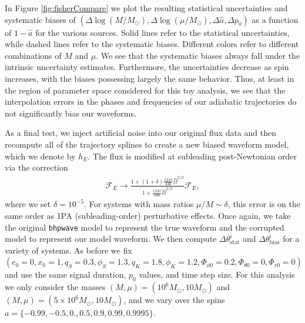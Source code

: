 \documentclass[%
 reprint,
 nofootinbib,
 amsmath,amssymb,
 aps,
 prd,
]{revtex4-2}
\begin{document}
In Figure \ref{fig:fisherCompare} we plot the resulting statistical uncertainties and systematic biases of $(\Delta\log(M/M_\odot), \Delta\log(\mu/M_\odot), \Delta \hat{a}, \Delta p_0)$ as a function of $1-\hat{a}$ for the various sources. Solid lines refer to the statistical uncertainties, while dashed lines refer to the systematic biases. Different colors refer to different combinations of $M$ and $\mu$. We see that the systematic biases always fall under the intrinsic uncertainty estimates. Furthermore, the uncertainties decrease as spin increases, with the biases possessing largely the same behavior. Thus, at least in the region of parameter space considered for this toy analysis, we see that the interpolation errors in the phases and frequencies of our adiabatic trajectories do not significantly bias our waveforms.

As a final test, we inject artificial noise into our original flux data and then recompute all of the trajectory splines to create a new biased waveform model, which we denote by $h_E$. The flux is modified at subleading post-Newtonian order via the correction
\begin{align}
    \mathcal{F}_E \rightarrow \frac{1 + (1 + \delta)\frac{1247}{336}\hat{\Omega}^{2/3}}{1 + \frac{1247}{336}\hat{\Omega}^{2/3}} \mathcal{F}_E,
\end{align}
where we set $\delta = 10^{-5}$. For systems with mass ratios $\mu/M \sim \delta$, this error is on the same order as 1PA (subleading-order) perturbative effects. Once again, we take the original \texttt{bhpwave} model to represent the true waveform and the corrupted model to represent our model waveform. We then compute $\Delta \theta^i_\mathrm{stat}$ and $\Delta \theta^i_\mathrm{bias}$ for a variety of systems. As before we fix $(e_0 = 0, x_0 = 1, q_S = 0.3, \phi_S = 1.3, q_K = 1.8, \phi_K = 1.2, \Phi_{\phi 0} = 0.2, \Phi_{\theta0} = 0, \Phi_{r0} = 0)$ and use the same signal duration, $p_0$ values, and time step size. For this analysis we only consider the masses $(M, \mu) = (10^6 M_\odot, 10 M_\odot)$ and $(M, \mu) = (5\times 10^6 M_\odot, 10 M_\odot)$, and we vary over the spins $a = \{-0.99, -0.5, 0., 0.5, 0.9, 0.99, 0.9995\}$.
\end{document}

